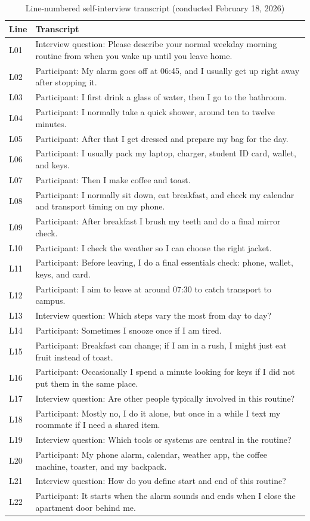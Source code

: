 \begin{table}[H]
\centering
\footnotesize
\caption{Line-numbered self-interview transcript (conducted February 18, 2026)}
\label{tab:app_transcript_part1}
\begin{tabularx}{\textwidth}{l X}
\toprule
Line & Transcript \\
\midrule
L01 & Interview question: Please describe your normal weekday morning routine from when you wake up until you leave home. \\
L02 & Participant: My alarm goes off at 06:45, and I usually get up right away after stopping it. \\
L03 & Participant: I first drink a glass of water, then I go to the bathroom. \\
L04 & Participant: I normally take a quick shower, around ten to twelve minutes. \\
L05 & Participant: After that I get dressed and prepare my bag for the day. \\
L06 & Participant: I usually pack my laptop, charger, student ID card, wallet, and keys. \\
L07 & Participant: Then I make coffee and toast. \\
L08 & Participant: I normally sit down, eat breakfast, and check my calendar and transport timing on my phone. \\
L09 & Participant: After breakfast I brush my teeth and do a final mirror check. \\
L10 & Participant: I check the weather so I can choose the right jacket. \\
L11 & Participant: Before leaving, I do a final essentials check: phone, wallet, keys, and card. \\
L12 & Participant: I aim to leave at around 07:30 to catch transport to campus. \\
L13 & Interview question: Which steps vary the most from day to day? \\
L14 & Participant: Sometimes I snooze once if I am tired. \\
L15 & Participant: Breakfast can change; if I am in a rush, I might just eat fruit instead of toast. \\
L16 & Participant: Occasionally I spend a minute looking for keys if I did not put them in the same place. \\
L17 & Interview question: Are other people typically involved in this routine? \\
L18 & Participant: Mostly no, I do it alone, but once in a while I text my roommate if I need a shared item. \\
L19 & Interview question: Which tools or systems are central in the routine? \\
L20 & Participant: My phone alarm, calendar, weather app, the coffee machine, toaster, and my backpack. \\
L21 & Interview question: How do you define start and end of this routine? \\
L22 & Participant: It starts when the alarm sounds and ends when I close the apartment door behind me. \\
\bottomrule
\end{tabularx}
\end{table}

